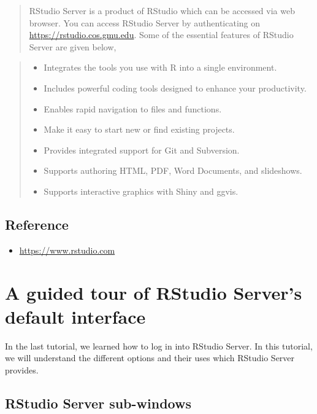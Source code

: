\documentclass[
]{book}
\providecommand{\tightlist}{%
  \setlength{\itemsep}{0pt}\setlength{\parskip}{0pt}}
\begin{document}
\begin{quote}
RStudio Server is a product of RStudio which can be accessed via web browser. You can access RStudio Server by authenticating on \url{https://rstudio.cos.gmu.edu}. Some of the essential features of RStudio Server are given below,
\end{quote}

\begin{quote}
\begin{itemize}
\tightlist
\item
  Integrates the tools you use with R into a single environment.
\item
  Includes powerful coding tools designed to enhance your productivity.
\item
  Enables rapid navigation to files and functions.
\item
  Make it easy to start new or find existing projects.
\item
  Provides integrated support for Git and Subversion.
\item
  Supports authoring HTML, PDF, Word Documents, and slideshows.
\item
  Supports interactive graphics with Shiny and ggvis.
\end{itemize}
\end{quote}

\hypertarget{reference}{%
\subsection{Reference}\label{reference}}

\begin{itemize}
\tightlist
\item
  \url{https://www.rstudio.com}
\end{itemize}

\hypertarget{a-guided-tour-of-rstudio-servers-default-interface}{%
\section{A guided tour of RStudio Server's default interface}\label{a-guided-tour-of-rstudio-servers-default-interface}}

In the last tutorial, we learned how to log in into RStudio Server. In this tutorial, we will understand the different options and their uses which RStudio Server provides.

\hypertarget{rstudio-server-sub-windows}{%
\subsection{RStudio Server sub-windows}\label{rstudio-server-sub-windows}}
\end{document}

